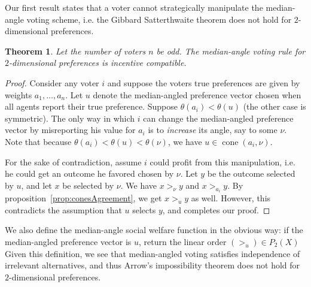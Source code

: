 \documentclass[12pt]{article}
\newtheorem{theorem}{Theorem}
\DeclareMathOperator*{\cone}{cone}
\newcommand{\1}[1]{\mathds{1}[{#1}]}
\begin{document}
  Our first result states that a voter cannot strategically manipulate the
  median-angle voting scheme, i.e. the Gibbard Satterthwaite theorem does not
  hold for $2$-dimensional preferences.
  \begin{theorem}\label{thrm:2DincentiveCompat}
    Let the number of voters $n$ be odd.
    The median-angle voting rule for $2$-dimensional preferences
    is incentive compatible.
  \end{theorem}
  \begin{proof}
    Consider any voter $i$ and suppose the voters true preferences 
    are given by weights $a_1,\ldots,a_n$.
    Let $u$ denote the median-angled preference vector chosen when all
    agents report their true preference.
    Suppose $\theta(a_i) < \theta(u)$ (the other case is symmetric).
    The only way in which $i$ can change the median-angled preference vector
    by misreporting his value for $a_i$
    is to \emph{increase} its angle, say to some $\nu$.
    Note that because $\theta(a_i) < \theta(u) < \theta(\nu)$,
    we have $u \in \cone(a_i, \nu)$.

    For the sake of contradiction, assume $i$ could profit from this
    manipulation, i.e. he could get an outcome he favored chosen by $\nu$.
    Let $y$ be the outcome selected by $u$, and let $x$ be selected by $\nu$.
    We have $x >_\nu y$ and $x >_{a_i} y$.
    By proposition~\ref{prop:conesAgreement}, we get $x >_u y$ as well.
    However, this contradicts the assumption that $u$ selects $y$,
    and completes our proof.
  \end{proof}

  We also define the median-angle social welfare function in the obvious way: if
  the median-angled preference vector is $u$,
  return the linear order $(>_u) \in P_2(X)$
  Given this definition, we see that median-angled voting satisfies independence
  of irrelevant alternatives, and thus Arrow's impossibility theorem does not
  hold for $2$-dimensional preferences.
\end{document}
